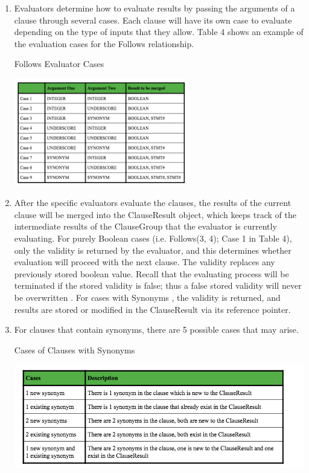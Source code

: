 \documentclass[12pt]{article}
\begin{document}
{{{{{{{{{{{{{\begin{enumerate}
\item Evaluators determine how to evaluate results by passing the arguments of a clause through several cases. Each clause will have its own case to evaluate depending on the type of inputs that they allow. Table 4 shows an example of the evaluation cases for the Follows relationship.
\begin{table}[H]
  \centering 
  \caption{Follows Evaluator Cases}
 \includegraphics[width=0.6\textwidth]{FollowsEvaluatorCases.png}
\end{table}
\item After the specific evaluators evaluate the clauses, the results of the current clause will be merged into the ClauseResult object, which keeps track of the intermediate results of the ClauseGroup that the evaluator is currently evaluating. For purely Boolean cases (i.e. Follows(3, 4); Case 1 in Table 4), only the validity is returned by the evaluator, and this determines whether evaluation will proceed with the next clause. The validity replaces any previously stored boolean value. Recall that the evaluating process will be terminated if the stored validity is false; thus a false stored validity will never be overwritten . For cases with Synonyms , the validity is returned, and results are stored or modified in the ClauseResult via its reference pointer.
\item For clauses that contain synonyms, there are 5 possible cases that may arise.
\begin{table}[H]
  \centering 
  \caption{Cases of Clauses with Synonyms}
 \includegraphics[width=1.0\textwidth]{SynonymClauses.png}

\end{table}
\end{enumerate}}}}}}}}}}}}}}
\end{document}

